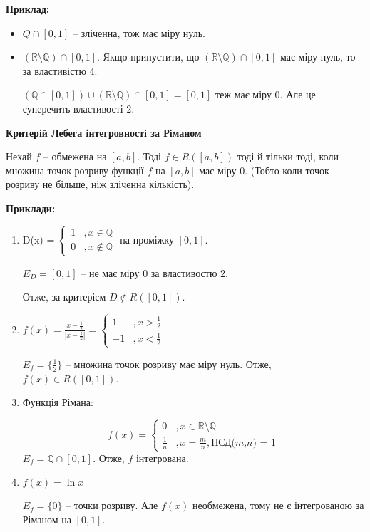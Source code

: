 \documentclass[12pt]{report}
\begin{document}
\textbf{Приклад:}

\begin{itemize}

\item $Q \cap [0,1]$ -- зліченна, тож має міру нуль.
\item $(\mathbb{R} \setminus \mathbb{Q}) \cap [0,1]$. Якщо припустити, що $(\mathbb{R} \setminus \mathbb{Q}) \cap [0,1]$ 
має міру нуль, то за властивістю $4$:

$(\mathbb{Q}\cap[0,1]) \cup (\mathbb{R} \setminus \mathbb{Q}) \cap [0,1] = [0,1]$ теж має міру 0. Але це суперечить властивості $2$.

\end{itemize}
 

\textbf{Критерій Лебега інтегровності за Ріманом}

Нехай $f$ -- обмежена на $[a,b]$. Тоді $f \in R([a,b])$ тоді й тільки тоді, коли множина точок розриву функції $f$ на $[a,b]$ має міру $0$.
(Тобто коли точок розриву не більше, ніж зліченна кількість).

\textbf{Приклади:}

\begin{enumerate}
\item D(x) = $\begin{cases} 1 &, x \in \mathbb{Q} \\ 0 &, x \notin \mathbb{Q} \end{cases}$ на проміжку $[0,1]$.

$E_{D} = [0,1]$ -- не має міру $0$ за властивостю $2$.

Отже, за критерієм $D \notin R([0,1])$.

\item $f(x) = \frac{x - \frac{1}{2}}{|x - \frac{1}{2}|} = \begin{cases} 1 &, x > \frac{1}{2} \\ -1 &, x < \frac{1}{2} \end{cases}$

$E_f = \{\frac{1}{2}\}$ -- множина точок розриву має міру нуль. Отже, $f(x) \in R([0,1])$.

\item Функція Рімана:

$$f(x) = \begin{cases} 0 &, x \in \mathbb{R} \setminus \mathbb{Q} \\ 
					   \frac{1}{n} &, x = \frac{m}{n}, \textrm{НСД($m$,$n$) = 1}
		 \end{cases}$$
$E_f = \mathbb{Q} \cap [0,1]$. Отже, $f$ інтегрована.

\item $f(x) = \ln x$

$E_f = \{0\}$ -- точки розриву. Але $f(x)$ необмежена, тому не є інтегрованою за Ріманом на $[0,1]$.

\end{enumerate}
 
\end{document}
